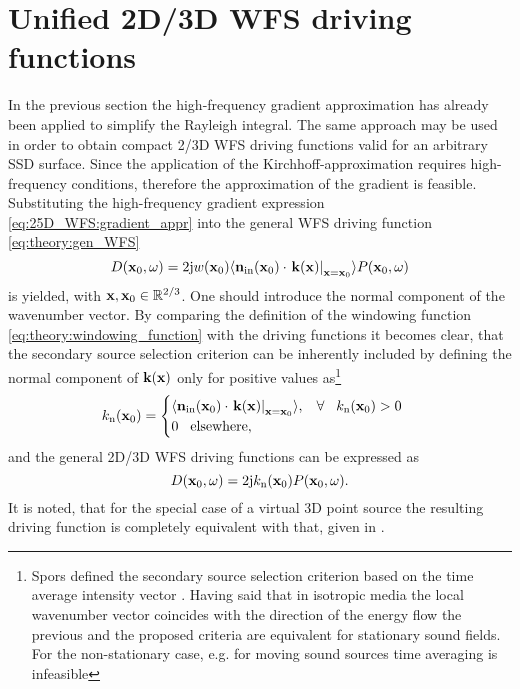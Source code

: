 \section{Unified 2D/3D WFS driving functions}
In the previous section the high-frequency gradient approximation has already been applied to simplify the Rayleigh integral.
The same approach may be used in order to obtain compact 2/3D WFS driving functions valid for an arbitrary SSD surface. Since the application of the Kirchhoff-approximation requires high-frequency conditions, therefore the approximation of the gradient is feasible.
Substituting the high-frequency gradient expression \eqref{eq:25D_WFS:gradient_appr} into the general WFS driving function \eqref{eq:theory:gen_WFS}
\begin{equation}
D(\mathbf{x}_0,\omega) = 2\mathrm{j} w(\mathbf{x}_0) \langle \mathbf{n}_{\mathrm{in}}(\mathbf{x}_0) \cdot \left. \mathbf{k}(\mathbf{x})\right|_{\mathbf{x} = \mathbf{x}_0}\rangle P(\mathbf{x}_0,\omega)
\end{equation}
is yielded, with $\mathbf{x}, \mathbf{x}_0 \in \mathbb{R}^{2/3}$.
One should introduce the normal component of the wavenumber vector. By comparing the definition of the windowing function \eqref{eq:theory:windowing_function} with the driving functions it becomes clear, that the secondary source selection criterion can be inherently included by defining the normal component of $\mathbf{k}(\mathbf{x})$ only for positive values as\footnote{Spors defined the secondary source selection criterion based on the time average intensity vector \cite{Spors2007:DAGA:SS_selection_criterion, Spors2007}. Having said that in isotropic media the local wavenumber vector coincides with the direction of the energy flow the previous and the proposed criteria are equivalent for stationary sound fields. For the non-stationary case, e.g. for moving sound sources time averaging is infeasible}
\begin{equation}
k_\mathrm{n}(\mathbf{x}_0) = \begin{cases}
                        \langle \mathbf{n}_{\mathrm{in}}(\mathbf{x}_0) \cdot \left. \mathbf{k}(\mathbf{x})\right|_{\mathbf{x} = \mathbf{x}_0}\rangle, \hspace{3mm} \forall \hspace{3mm} k_\mathrm{n}(\mathbf{x}_0) > 0 \\
                        0  \hspace{3mm} \text{elsewhere},
                    \end{cases}
\label{eq:25D_WFS:normal_k}
\end{equation}
and the general 2D/3D WFS driving functions can be expressed as
\begin{equation}
D(\mathbf{x}_0,\omega) = 2\mathrm{j}k_\mathrm{n}(\mathbf{x}_0)  P(\mathbf{x}_0,\omega).
\label{eq:25D_WFS:generalized_2d_3d_wfs}
\end{equation}
It is noted, that for the special case of a virtual 3D point source the resulting driving function is completely equivalent with that, given in \cite[Eq.(20)]{Zotter2013:uniqueness}.	

